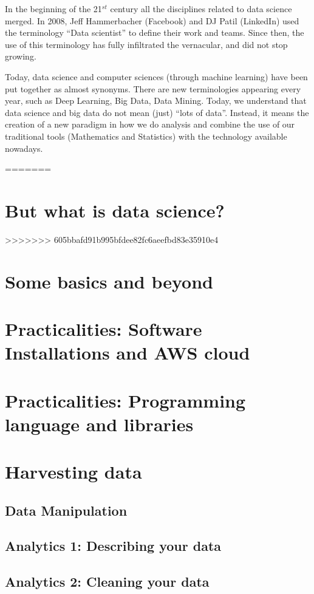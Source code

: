 \documentclass[10pt]{PhDthesisPSnPDF}%
\begin{document}
In the beginning of the 21$^{st}$ century all the disciplines related to data science merged. In 2008, Jeff Hammerbacher (Facebook) and DJ Patil (LinkedIn) used the terminology ``Data scientist'' to define their work and teams. Since then, the use of this terminology has fully infiltrated the vernacular, and did not stop growing. 

Today, data science and computer sciences (through machine learning) have been put together as almost synonyms. There are new terminologies appearing every year, such as Deep Learning, Big Data, Data Mining. Today, we understand that data science and big data do not mean (just) ``lots of data''. Instead, it means the creation of a new paradigm in how we do analysis and combine the use of our traditional tools (Mathematics and Statistics) with the technology available nowadays.

 


=======
\chapter{But what is data science?}\label{DS} 
>>>>>>> 605bbafd91b995bfdee82fc6aeefbd83e35910e4
\chapter{Some basics and beyond}\label{basics}
\chapter{Practicalities: Software Installations and AWS cloud}\label{P1}
\chapter{Practicalities: Programming language and libraries}\label{P2}
\chapter{Harvesting data} \label{harvesting}
\section{Data Manipulation}\label{dataM} 
\section{Analytics 1: Describing your data}\label{Analy.1}
\section{Analytics 2: Cleaning your data}\label{Analy.2}
\end{document}
